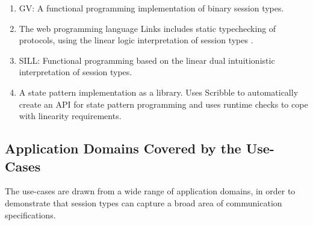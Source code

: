 \begin{enumerate}
	\item	GV:			A functional programming implementation of binary session types. 
	\item	The web programming language Links \cite{} includes static typechecking of protocols, using the linear logic interpretation of session types \cite{}.
	\item	SILL:		Functional programming based on the linear dual intuitionistic interpretation of session types. 

	\item	A state pattern implementation as a library. Uses Scribble to automatically
			create an API for state pattern programming and uses runtime checks to
			cope with linearity requirements.

\end{enumerate}

\subsection{Application Domains Covered by the Use-Cases}

The use-cases are drawn from a wide range of
application domains, in order to demonstrate that
session types can capture
a broad area of communication specifications.


